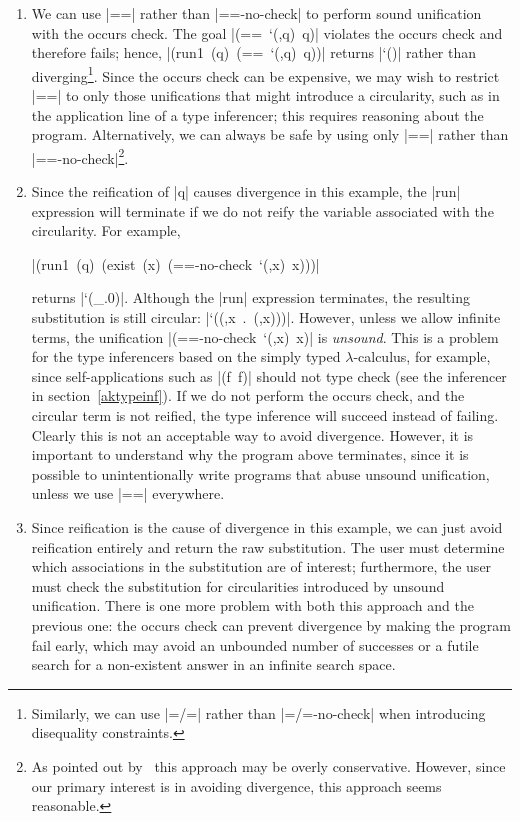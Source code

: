 \begin{enumerate}

\item We can use \scheme|==| rather than \scheme|==-no-check| to
  perform sound unification with the occurs check.  The goal
  \mbox{\scheme|(== `(,q) q)|} violates the occurs check and therefore
  fails; hence, \mbox{\scheme|(run1 (q) (== `(,q) q))|} returns
  \mbox{\schemeresult|`()|} rather than diverging\footnote{Similarly,
    we can use \scheme|=/=| rather than \scheme|=/=-no-check| when
    introducing disequality constraints.}.  Since the occurs check can
  be expensive, we may wish to restrict \scheme|==| to only those
  unifications that might introduce a circularity, such as in the
  application line of a type inferencer; this requires reasoning about
  the program.  Alternatively, we can always be safe by using only
  \scheme|==| rather than \scheme|==-no-check|\footnote{As pointed out
    by~\citet{occurcheck} this approach may be overly conservative.
    However, since our primary interest is in avoiding divergence, this
    approach seems reasonable.}.

\item Since the reification of \scheme|q| causes divergence in
this example, the \scheme|run| expression will terminate if we do not
reify the variable associated with the circularity.  For example,

\mbox{\scheme|(run1 (q) (exist (x) (==-no-check `(,x) x)))|}

\noindent returns \mbox{\schemeresult|`(_.0)|}.  Although the
\scheme|run| expression terminates, the resulting substitution is
still circular: \mbox{\scheme|`((,x . (,x)))|}.
However, unless we allow infinite terms,
the unification \mbox{\scheme|(==-no-check `(,x) x)|} is \emph{unsound}.  This
is a problem for the type inferencers based on the simply typed $\lambda$-calculus, 
for example, since self-applications such
as \mbox{\scheme|(f f)|} should not type check (see the inferencer in section~\ref{aktypeinf}).  
If we do not perform
the occurs check, and the circular term
is not reified, the type inference will succeed instead of failing.
Clearly this is not an acceptable way to avoid divergence.  However,
it is important to understand why the program above terminates,
since it is possible to unintentionally write programs that abuse
unsound unification, unless we use \scheme|==| everywhere.

\item Since reification is the cause of divergence in this
example, we can just avoid reification entirely and return the raw
substitution.  The user must determine which associations in the
substitution are of interest; furthermore, the user must check the
substitution for circularities introduced by unsound unification.
There is one more problem with both this approach and the previous
one: the occurs check can prevent divergence by making the program
fail early, which may avoid an unbounded number of successes or a
futile search for a non-existent answer in an infinite search space.


\end{enumerate}

